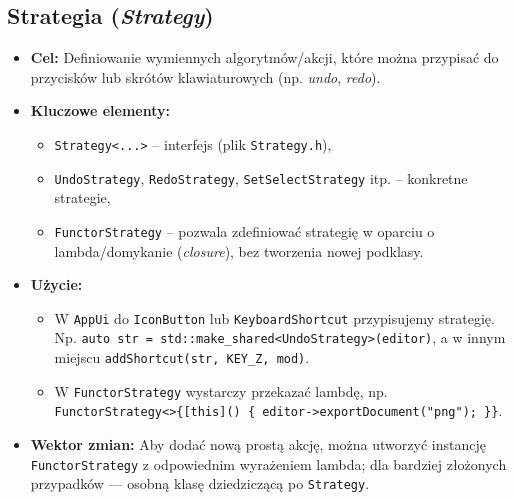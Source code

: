 \documentclass[a4paper,12pt]{article}
\begin{document}
\subsection{Strategia (\emph{Strategy})}
\begin{itemize}
    \item \textbf{Cel:} Definiowanie wymiennych algorytmów/akcji, 
    które można przypisać do przycisków lub skrótów klawiaturowych (np. \emph{undo}, \emph{redo}).
    \item \textbf{Kluczowe elementy:}
    \begin{itemize}
        \item \texttt{Strategy<...>} -- interfejs (plik \texttt{Strategy.h}), 
        \item \texttt{UndoStrategy}, \texttt{RedoStrategy}, \texttt{SetSelectStrategy} 
        itp. -- konkretne strategie,
        \item \texttt{FunctorStrategy} -- pozwala zdefiniować strategię
        w oparciu o lambda/domykanie (\emph{closure}), bez tworzenia nowej podklasy.
    \end{itemize}
    \item \textbf{Użycie:} 
    \begin{itemize}
       \item W \texttt{AppUi} do \texttt{IconButton} lub \texttt{KeyboardShortcut} przypisujemy 
       strategię. Np. \texttt{auto str = std::make\_shared<UndoStrategy>(editor)},
       a w innym miejscu \texttt{addShortcut(str, KEY\_Z, mod)}.
       \item W \texttt{FunctorStrategy} wystarczy przekazać lambdę, 
       np. \texttt{FunctorStrategy<>\{[this]() \{ editor->exportDocument("png"); \}\}}.
    \end{itemize}
    \item \textbf{Wektor zmian:} Aby dodać nową prostą akcję, można utworzyć
    instancję \texttt{FunctorStrategy} z odpowiednim wyrażeniem lambda; 
    dla bardziej złożonych przypadków — osobną klasę dziedziczącą po \texttt{Strategy}.
\end{itemize}
\end{document}
